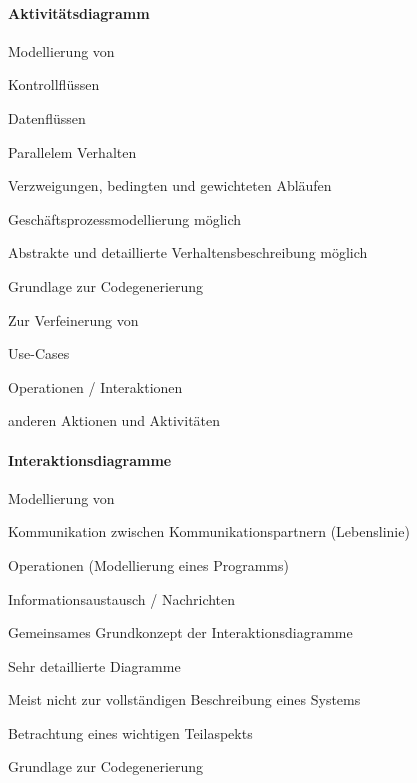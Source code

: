 \documentclass[a4paper]{article}
\begin{document}
\begin{multicols}{3}
  \paragraph{Aktivitätsdiagramm}
  \begin{itemize*}
    \item Modellierung von
          \begin{itemize*}
            \item Kontrollflüssen
            \item Datenflüssen
            \item Parallelem Verhalten
            \item Verzweigungen, bedingten und gewichteten Abläufen
          \end{itemize*}
    \item Geschäftsprozessmodellierung möglich
    \item Abstrakte und detaillierte Verhaltensbeschreibung möglich
    \item Grundlage zur Codegenerierung
    \item Zur Verfeinerung von
          \begin{itemize*}
            \item Use-Cases
            \item Operationen / Interaktionen
            \item anderen Aktionen und Aktivitäten
          \end{itemize*}
  \end{itemize*}

  \paragraph{Interaktionsdiagramme}
  \begin{itemize*}
    \item Modellierung von
          \begin{itemize*}
            \item Kommunikation zwischen Kommunikationspartnern (Lebenslinie)
            \item Operationen (Modellierung eines Programms)
            \item Informationsaustausch / Nachrichten
          \end{itemize*}
    \item Gemeinsames Grundkonzept der Interaktionsdiagramme
    \item Sehr detaillierte Diagramme
          \begin{itemize*}
            \item Meist nicht zur vollständigen Beschreibung eines Systems
            \item Betrachtung eines wichtigen Teilaspekts
          \end{itemize*}
    \item Grundlage zur Codegenerierung
  \end{itemize*}


\end{multicols}
\end{document}
